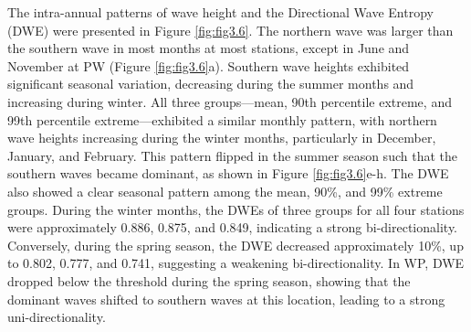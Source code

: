 The intra-annual patterns of wave height and the Directional Wave Entropy (DWE)
were presented in Figure \ref{fig:fig3.6}. The northern wave was larger than the
southern wave in most months at most stations, except in June and November at PW
(Figure \ref{fig:fig3.6}a). Southern wave heights exhibited significant
seasonal variation, decreasing during the summer months and increasing during
winter. All three groups—mean, 90th percentile extreme, and 99th percentile
extreme—exhibited a similar monthly pattern, with northern wave heights
increasing during the winter months, particularly in December, January, and
February. This pattern flipped in the summer season such that the southern waves
became dominant, as shown in Figure \ref{fig:fig3.6}e-h. The DWE also showed a
clear seasonal pattern among the mean, 90\%, and 99\% extreme groups. During the
winter months, the DWEs of three groups for all four stations were approximately
0.886, 0.875, and 0.849, indicating a strong bi-directionality. Conversely,
during the spring season, the DWE decreased approximately 10\%, up to 0.802,
0.777, and 0.741, suggesting a weakening bi-directionality. In WP, DWE dropped
below the threshold during the spring season, showing that the dominant waves
shifted to southern waves at this location, leading to a strong
uni-directionality.  

